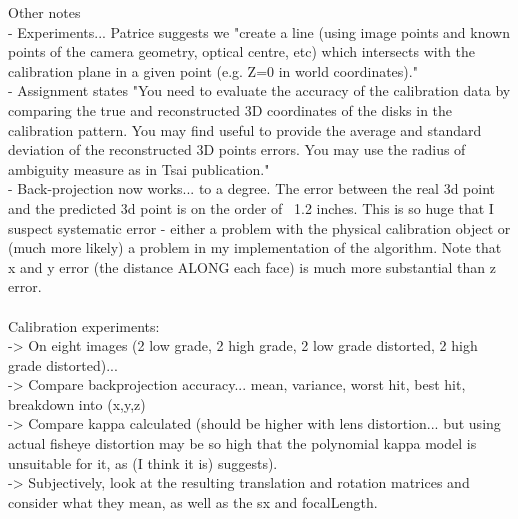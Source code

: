 Other notes\\
- Experiments... Patrice suggests we "create a line (using image points and known points of the camera geometry, optical centre, etc) which intersects with the calibration plane in a given point (e.g. Z=0 in world coordinates)."\\
- Assignment states "You need to evaluate the accuracy of the calibration data by comparing the true and reconstructed 3D coordinates of the disks in the calibration pattern. You may find useful to provide the average and standard deviation of the reconstructed 3D points errors. You may use the radius of ambiguity measure as in Tsai publication."\\
- Back-projection now works... to a degree. The error between the real 3d point and the predicted 3d point is on the order of ~1.2 inches. This is so huge that I suspect systematic error - either a problem with the physical calibration object or (much more likely) a problem in my implementation of the algorithm. Note that x and y error (the distance ALONG each face) is much more substantial than z error.\\
\\
Calibration experiments:\\
-> On eight images (2 low grade, 2 high grade, 2 low grade distorted, 2 high grade distorted)...\\
-> Compare backprojection accuracy... mean, variance, worst hit, best hit, breakdown into (x,y,z) \\
-> Compare kappa calculated (should be higher with lens distortion... but using actual fisheye distortion may be so high that the polynomial kappa model is unsuitable for it, as \cite{straightlines} (I think it is) suggests).\\
-> Subjectively, look at the resulting translation and rotation matrices and consider what they mean, as well as the sx and focalLength.\\

